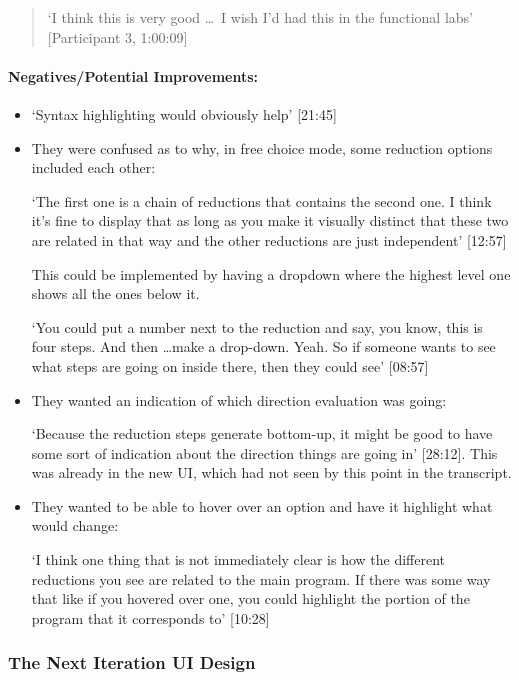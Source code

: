 \begin{quotation}
\noindent `I think this is very good \ldots\ I wish I'd had this in the functional labs' [Participant 3, 1:00:09]
\end{quotation} 

\paragraph{Negatives/Potential Improvements:}
\begin{itemize}
    \item `Syntax highlighting would obviously help' [21:45]
    \item They were confused as to why, in free choice mode, some reduction options included each other: 
    
    `The first one is a chain of reductions that contains the second one. I think it's fine to display that as long as you make it visually distinct that these two are related in that way and the other reductions are just independent' [12:57]

    This could be implemented by having a dropdown where the highest level one shows all the ones below it. 

    `You could put a number next to the reduction and say, you know, this is four steps. And then \ldots make a drop-down. Yeah. So if someone wants to see what steps are going on inside there, then they could see' [08:57]
    \item They wanted an indication of which direction evaluation was going: 
    
    `Because the reduction steps generate bottom-up, it might be good to have some sort of indication about the direction things are going in' [28:12]. This was already in the new UI, which had not seen by this point in the transcript.

    \item They wanted to be able to hover over an option and have it highlight what would change: 
    
    `I think one thing that is not immediately clear is how the different reductions you see are related to the main program. If there was some way that like if you hovered over one, you could highlight the portion of the program that it corresponds to' [10:28]
\end{itemize}

\subsubsection{The Next Iteration UI Design}

